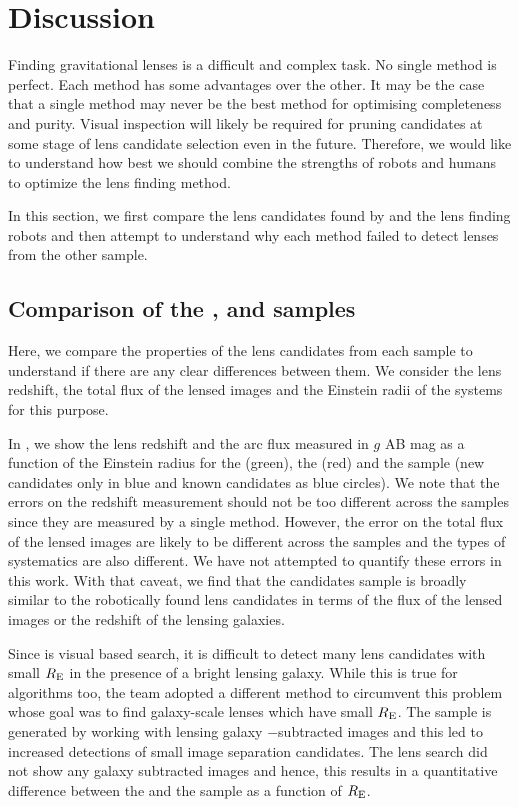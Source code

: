 \documentclass[useAMS,usenatbib,a4paper]{mn2e}
\begin{document}
\section{Discussion}
\label{sec:discuss}

Finding gravitational lenses is a difficult and complex task. No single
method is perfect. Each method has some advantages over the other. It
may be the case that a single method may never be the best method for
optimising completeness and purity. Visual inspection will likely be
required for pruning candidates at some stage of lens candidate
selection even in the future. Therefore, we would like to understand how
best we should combine the strengths of robots and humans to optimize
the lens finding method.

In this section, we first compare the lens candidates found by
\sw and the lens finding robots and then attempt to understand why each
method failed to detect lenses from the other sample.

\subsection{Comparison of the \rf, \sw and \af samples}
Here, we compare the properties of the lens candidates from each sample
to understand if there are any clear differences between them. We
consider the lens redshift, the total flux of the lensed images and the
Einstein radii of the systems for this purpose.

In , we show the lens redshift and the arc flux
measured in $g$ AB mag as a function of the Einstein radius for the \rf
(green), the \af (red) and the \sw sample (new candidates only in blue
and known candidates as blue circles). We note that the errors on the
redshift measurement should not be too different across the samples
since they are measured by a single method. However, the error on the
total flux of the lensed images are likely to be different across the
samples and the types of systematics are also different.  We have not
attempted to quantify these errors in this work. With that caveat, we
find that the \sw candidates sample is broadly similar to the
robotically found lens candidates in terms of the flux of the lensed
images or the redshift of the lensing galaxies.

Since \sw is visual based search, it is difficult to detect many lens
candidates with small $R_{\rm E}$ in the presence of a bright lensing
galaxy. While this is true for algorithms too, the \rf team adopted a
different method to circumvent this problem whose goal was to find
galaxy-scale lenses which have small $R_{\rm E}$. The \rf sample is
generated by working with lensing galaxy $-$subtracted images and this
led to increased detections of small image separation candidates. The
\sw lens search did not show any galaxy subtracted images and hence,
this results in a quantitative difference between the \sw and the \rf
sample as a function of $R_{\rm E}$.
\end{document}
